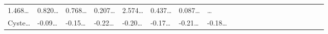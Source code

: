 \documentclass[
]{article}
\begin{document}
\begin{longtable}[]{@{}lllllllllllllllllllll@{}}
\begin{minipage}[t]{0.03\columnwidth}
1.468\ldots{}\strut
\end{minipage} & \begin{minipage}[t]{0.03\columnwidth}\raggedright
0.820\ldots{}\strut
\end{minipage} & \begin{minipage}[t]{0.03\columnwidth}\raggedright
0.768\ldots{}\strut
\end{minipage} & \begin{minipage}[t]{0.03\columnwidth}\raggedright
0.207\ldots{}\strut
\end{minipage} & \begin{minipage}[t]{0.03\columnwidth}\raggedright
2.574\ldots{}\strut
\end{minipage} & \begin{minipage}[t]{0.03\columnwidth}\raggedright
0.437\ldots{}\strut
\end{minipage} & \begin{minipage}[t]{0.03\columnwidth}\raggedright
0.087\ldots{}\strut
\end{minipage} & \begin{minipage}[t]{0.01\columnwidth}\raggedright
\ldots{}\strut
\end{minipage}\tabularnewline
\begin{minipage}[t]{0.03\columnwidth}\raggedright
Cyste\ldots{}\strut
\end{minipage} & \begin{minipage}[t]{0.03\columnwidth}\raggedright
-0.09\ldots{}\strut
\end{minipage} & \begin{minipage}[t]{0.03\columnwidth}\raggedright
-0.15\ldots{}\strut
\end{minipage} & \begin{minipage}[t]{0.03\columnwidth}\raggedright
-0.22\ldots{}\strut
\end{minipage} & \begin{minipage}[t]{0.03\columnwidth}\raggedright
-0.20\ldots{}\strut
\end{minipage} & \begin{minipage}[t]{0.03\columnwidth}\raggedright
-0.17\ldots{}\strut
\end{minipage} & \begin{minipage}[t]{0.03\columnwidth}\raggedright
-0.21\ldots{}\strut
\end{minipage} & \begin{minipage}[t]{0.03\columnwidth}\raggedright
-0.18\ldots{}\strut
\end{minipage} & \begin{minipage}[t]{0.03\columnwidth}\raggedright

\end{minipage}
\end{longtable}
\end{document}
